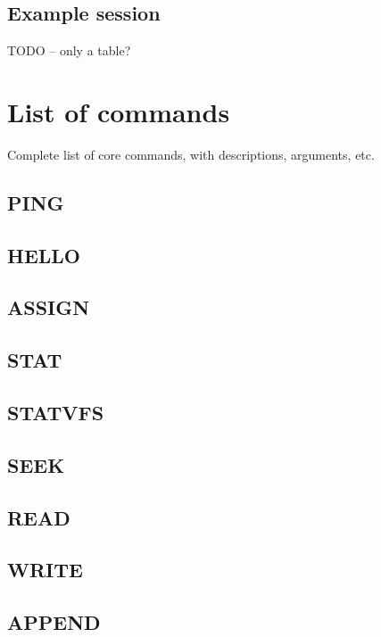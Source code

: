 \subsection{Example session}

TODO -- only a table?


\section{List of commands}

Complete list of core commands, with descriptions, arguments, etc.

\subsection{PING}

\subsection{HELLO}

\subsection{ASSIGN}

\subsection{STAT}

\subsection{STATVFS}

\subsection{SEEK}

\subsection{READ}

\subsection{WRITE}

\subsection{APPEND}

